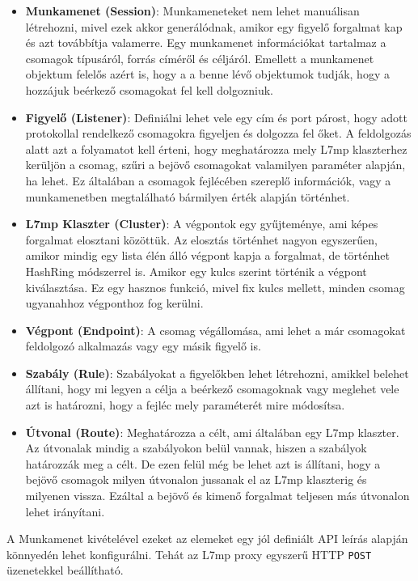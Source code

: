 \begin{itemize}
	\item \textbf{Munkamenet (Session)}: Munkameneteket nem lehet manuálisan létrehozni,
	mivel ezek akkor generálódnak, amikor egy figyelő forgalmat kap és azt 
	továbbítja valamerre. Egy munkamenet információkat tartalmaz a csomagok típusáról,
	forrás címéről és céljáról. Emellett a munkamenet objektum felelős azért is, hogy a
	a benne lévő objektumok tudják, hogy a hozzájuk beérkező csomagokat fel kell 
	dolgozniuk. 
	\item \textbf{Figyelő (Listener)}: Definiálni lehet vele egy cím és port párost, hogy
	adott protokollal rendelkező csomagokra figyeljen és dolgozza fel őket. A feldolgozás
	alatt azt a folyamatot kell érteni, hogy meghatározza mely L7mp klaszterhez kerüljön 
	a csomag, szűri a bejövő csomagokat valamilyen paraméter alapján, ha lehet. Ez 
	általában a csomagok fejlécében szereplő információk, vagy a munkamenetben 
	megtalálható bármilyen érték alapján történhet. 
	\item \textbf{L7mp Klaszter (Cluster)}: A végpontok egy gyűjteménye, ami képes 
	forgalmat elosztani közöttük. Az elosztás történhet nagyon egyszerűen, amikor mindig 
	egy lista élén álló végpont kapja a forgalmat, de történhet HashRing módszerrel is. 
	Amikor egy kulcs szerint történik a végpont kiválasztása. Ez egy hasznos funkció, 
	mivel fix kulcs mellett, minden csomag ugyanahhoz végponthoz fog kerülni. 
	\item \textbf{Végpont (Endpoint)}: A csomag végállomása, ami lehet a már csomagokat
	feldolgozó alkalmazás vagy egy másik figyelő is.
	\item \textbf{Szabály (Rule)}: Szabályokat a figyelőkben lehet létrehozni, amikkel
	belehet állítani, hogy mi legyen a célja a beérkező csomagoknak vagy meglehet vele azt
	is határozni, hogy a fejléc mely paraméterét mire módosítsa. 
	\item \textbf{Útvonal (Route)}: Meghatározza a célt, ami általában egy L7mp klaszter. 
	Az útvonalak mindig a szabályokon belül vannak, hiszen a szabályok határozzák meg a 
	célt. De ezen felül még be lehet azt is állítani, hogy a bejövő csomagok milyen 
	útvonalon jussanak el az L7mp klaszterig és milyenen vissza. Ezáltal a bejövő és 
	kimenő forgalmat teljesen más útvonalon lehet irányítani.
\end{itemize}

A Munkamenet kivételével ezeket az elemeket egy jól definiált API leírás alapján 
könnyedén lehet konfigurálni. Tehát az L7mp proxy egyszerű HTTP \texttt{POST} üzenetekkel 
beállítható.

